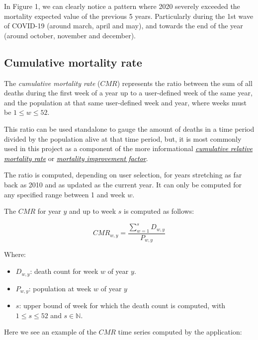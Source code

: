 \documentclass[
  a4paper]{article}
\begin{document}
In Figure 1, we can clearly notice a pattern where 2020 severely
exceeded the mortality expected value of the previous 5 years.
Particularly during the 1st wave of COVID-19 (around march, april and
may), and towards the end of the year (around october, november and
december).

\newpage

\hypertarget{CMR}{%
\subsection{Cumulative mortality rate}\label{CMR}}

The \emph{cumulative mortality rate} (\(CMR\)) represents the ratio
between the sum of all deaths during the first week of a year up to a
user-defined week of the same year, and the population at that same
user-defined week and year, where weeks must be \(1 \leq w \leq 52\).

This ratio can be used standalone to gauge the amount of deaths in a
time period divided by the population alive at that time period, but, it
is most commonly used in this project as a component of the more
informational
\emph{\protect\hyperlink{CRMR}{\textcolor{black}{cumulative relative
mortality rate}}} or
\emph{\protect\hyperlink{CMIF}{\textcolor{black}{mortality improvement
factor}}}.

The ratio is computed, depending on user selection, for years stretching
as far back as 2010 and as updated as the current year. It can only be
computed for any specified range between 1 and week \(w\).

The \(CMR\) for year \(y\) and up to week \(s\) is computed as follows:

\[CMR_{w, y} = \frac{\sum^{s}_{w=1} D_{w, y}}{P_{w, y}}\]

Where:

\begin{itemize}
\item
  \(D_{w, y}\): death count for week \(w\) of year \(y\).
\item
  \(P_{w, y}\): population at week \(w\) of year \(y\)
\item
  \(s\): upper bound of week for which the death count is computed, with
  \(1 \leq s \leq 52\) and \(s \in \mathbb{N}\).
\end{itemize}

Here we see an example of the \(CMR\) time series computed by the
application:
\end{document}
